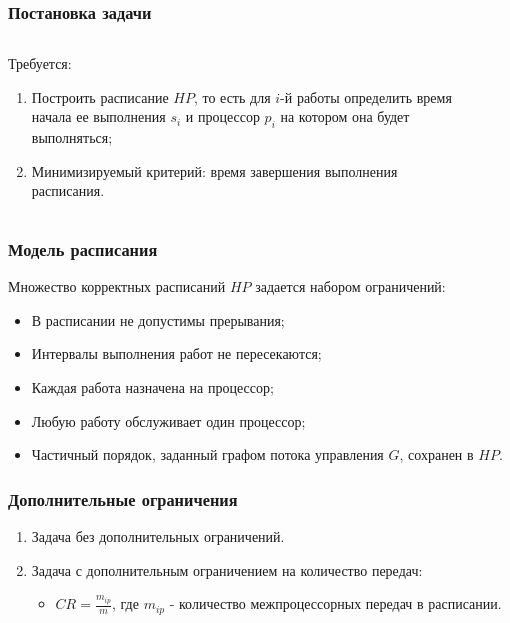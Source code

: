 \begin{frame}
    \frametitle{Постановка задачи}
    \begin{columns}
        \begin{column}{0.7\textwidth}
            Требуется:
            \begin{enumerate}
                \item Построить расписание $HP$, то есть для $i$-й работы определить время начала ее выполнения $s_i$ и процессор $p_i$ на котором она будет выполняться;
                \item Минимизируемый критерий: время завершения выполнения расписания.
            \end{enumerate}
        \end{column}
        \begin{column}{0.3\textwidth}
            \begin{figure}
                \tiny
                \captionsetup{labelformat=empty}
            \end{figure}
        \end{column}
    \end{columns}
\end{frame}

\begin{frame}
    \frametitle{Модель расписания}
    Множество корректных расписаний $HP$ задается набором ограничений:
    \begin{itemize}
        \item В расписании не допустимы прерывания;
        \item Интервалы выполнения работ не пересекаются;
        \item Каждая работа назначена на процессор;
        \item Любую работу обслуживает один процессор;
        \item Частичный порядок, заданный графом потока управления $G$, сохранен в $HP$.
    \end{itemize}
\end{frame}

\begin{frame}
    \frametitle{Дополнительные ограничения}
    \begin{enumerate}
        \item Задача без дополнительных ограничений.
        \item Задача с дополнительным ограничением на количество передач:
              \begin{itemize}
                  \item $CR = \frac{m_{ip}}{m}$, где $m_{ip}$ - количество межпроцессорных передач в расписании.
              \end{itemize}
    \end{enumerate}
\end{frame}

